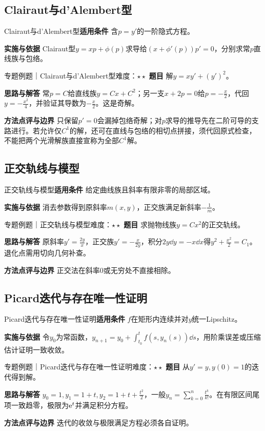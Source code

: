 \subsection{Clairaut与d’Alembert型}\label{mat:ode_theory:clairaut}
\begin{method}{Clairaut与d’Alembert型}\textbf{适用条件} 含$p=y\prime$的一阶隐式方程。\par\textbf{实施与依据} Clairaut型$y=xp+\phi(p)$求导给$(x+\phi\prime(p))p\prime=0$，分别求常$p$直线族与包络。\end{method}
\begin{example}{专题例题｜Clairaut与d’Alembert型}{难度：$\star\star$}
\textbf{题目} 解$y=xy\prime+(y\prime)^2$。\par\textbf{思路与解答} 常$p=C$给直线族$y=Cx+C^2$；另一支$x+2p=0$给$p=-\frac{x}{2}$，代回$y=-\frac{x^2}{4}$，并验证其导数为$-\frac{x}{2}$。这是奇解。\par\textbf{方法点评与边界} 只保留$p\prime=0$会漏掉包络奇解；对$p$求导的推导先在二阶可导的支路进行。若允许仅$C^1$的解，还可在直线与包络的相切点拼接，须代回原式检查，不能把两个光滑解族直接宣称为全部$C^1$解。
\end{example}
\subsection{正交轨线与模型}\label{mat:ode_theory:trajectory}
\begin{method}{正交轨线与模型}\textbf{适用条件} 给定曲线族且斜率有限非零的局部区域。\par\textbf{实施与依据} 消去参数得到原斜率$m(x,y)$，正交族满足新斜率$-\frac{1}{m}$。\end{method}
\begin{example}{专题例题｜正交轨线与模型}{难度：$\star\star$}
\textbf{题目} 求抛物线族$y=Cx^2$的正交轨线。\par\textbf{思路与解答} 原斜率$y\prime=\frac{2y}{x}$，正交族$y\prime=-\frac{x}{2y}$，积分$2y\dd y=-x\dd x$得$y^2+\frac{x^2}{2}=C_1$。退化点需用切向几何补查。\par\textbf{方法点评与边界} 正交法在斜率0或无穷处不直接相除。
\end{example}
\subsection{Picard迭代与存在唯一性证明}\label{mat:ode_theory:picard}
\begin{method}{Picard迭代与存在唯一性证明}\textbf{适用条件} $f$在矩形内连续并对$y$统一Lipschitz。\par\textbf{实施与依据} 令$y_0$为常函数，$y_{n+1}=y_0+\int_{t_0}^tf(s,y_n(s))\dd s$，用阶乘误差或压缩估计证明一致收敛。\end{method}
\begin{example}{专题例题｜Picard迭代与存在唯一性证明}{难度：$\star\star$}
\textbf{题目} 从$y\prime=y,y(0)=1$的迭代得到解。\par\textbf{思路与解答} $y_0=1,y_1=1+t,y_2=1+t+\frac{t^2}{2}$，一般$y_n=\sum_{k=0}^n\frac{t^k}{k!}$。在有限区间尾项一致趋零，极限为$\mathrm{e}^t$并满足积分方程。\par\textbf{方法点评与边界} 迭代的收敛与极限满足方程必须各自证明。
\end{example}
